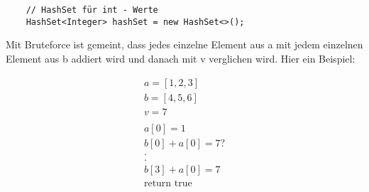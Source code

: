 \documentclass[12pt, oneside]{article}
\begin{document}
	\begin{center}
	\begin{verbatim}
	// HashSet für int - Werte
	HashSet<Integer> hashSet = new HashSet<>();
	\end{verbatim}
	\end{center}
Mit Bruteforce ist gemeint, dass jedes einzelne Element aus a mit jedem einzelnen Element aus b addiert wird und danach mit v verglichen wird. Hier ein Beispiel:
\begin{center}
\begin{align*}
	a = [1,2,3] \\
	b = [4,5,6] \\
	v = 7 \\ \\
	a[0] = 1 \\
	b[0] + a[0] = 7? \\
	. \\
	. \\
	b[3] + a[0] = 7 \\
	\text{return true}
	\end{align*}
\end{center}
\end{document}
